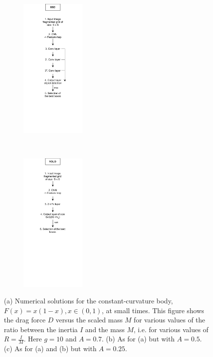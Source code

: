 \documentclass[12pt, french, a4paper]{article} %
\begin{document}
\begin{figure}[H]\ContinuedFloat
\begin{subfigure}{0.45\linewidth}
   \centering
  \includegraphics[height=7cm, keepratio]{figure/ssd_f.png}
  \vspace{-1.5cm}
   \caption{}
   \label{art_ssd}
  \end{subfigure}
    ~  \hspace{-2cm}
\begin{subfigure}{0.45\linewidth}
   \centering
  \includegraphics[height=7cm, keepratio]{figure/yolo_f.png}
    \vspace{-1.5cm}
   \caption{}
   \label{fig:art_yolo}
\end{subfigure}
\label{art}
\centering
\caption{(a) Numerical solutions for the constant-curvature body, $F(x)=x(1-x), x \in (0,1)$, at small times. This figure shows the drag force $D$ versus the scaled mass $M$ for various values of the ratio between the inertia $I$ and the mass $M$, i.e. for various values of $R=\frac{I}{M}$. Here $g=10$ and $A=0.7$. (b) As for (a) but with $A=0.5$. (c) As for (a) and (b) but with $A=0.25$.}
\end{figure}
\end{document}
